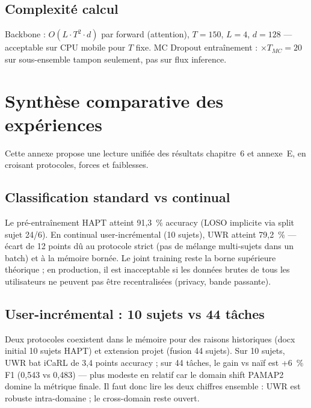 \documentclass[a4paper,12pt]{report}
\begin{document}
\section{Complexité calcul}

Backbone : $O(L \cdot T^2 \cdot d)$ par forward (attention), $T=150$, $L=4$,
$d=128$ — acceptable sur CPU mobile pour $T$ fixe. MC Dropout entraînement :
$\times T_{MC}=20$ sur sous-ensemble tampon seulement, pas sur flux inference.

\FloatBarrier



\chapter{Synthèse comparative des expériences}
\label{app:synth_exp}

Cette annexe propose une lecture unifiée des résultats chapitre~6 et annexe~E,
en croisant protocoles, forces et faiblesses.

\section{Classification standard vs continual}

Le pré-entraînement HAPT atteint 91,3~\% accuracy (LOSO implicite via split
sujet 24/6). En continual user-incrémental (10 sujets), UWR atteint 79,2~\% —
écart de 12 points dû au protocole strict (pas de mélange multi-sujets dans un
batch) et à la mémoire bornée. Le joint training reste la borne supérieure
théorique ; en production, il est inacceptable si les données brutes de tous
les utilisateurs ne peuvent pas être recentralisées (privacy, bande passante).

\section{User-incrémental : 10 sujets vs 44 tâches}

Deux protocoles coexistent dans le mémoire pour des raisons historiques (docx
initial 10 sujets HAPT) et extension projet (fusion 44 sujets). Sur 10 sujets,
UWR bat iCaRL de 3,4 points accuracy ; sur 44 tâches, le gain vs naïf est +6~\%
F1 (0,543 vs 0,483) — plus modeste en relatif car le domain shift PAMAP2 domine
la métrique finale. Il faut donc lire les deux chiffres ensemble : UWR est
robuste intra-domaine ; le cross-domain reste ouvert.
\end{document}
